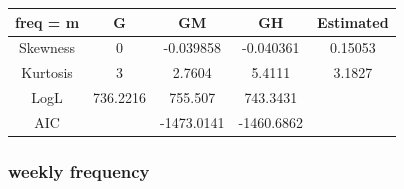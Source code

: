 \documentclass[16pt]{extarticle}
\begin{document}
\begin{center}
	\begin{tabular}{|c || c| c| c| c|} 
		\hline
		freq = m & G & GM & GH  & Estimated\\ [0.5ex] 
		\hline\hline
		Skewness & 0 & -0.039858 & -0.040361 & 0.15053 \\ 
		\hline
		Kurtosis & 3 & 2.7604 & 5.4111 & 3.1827\\
		\hline
		LogL & 736.2216 & 755.507 & 743.3431 \\
		\hline
		AIC &  & -1473.0141 & -1460.6862 \\[1ex] 
		\hline
	\end{tabular}
\end{center}
\subsubsection{weekly frequency}


\begin{figure}[H]
	\centering
	\hfill
	\hfill
	\caption{}
\end{figure}
\end{document}

